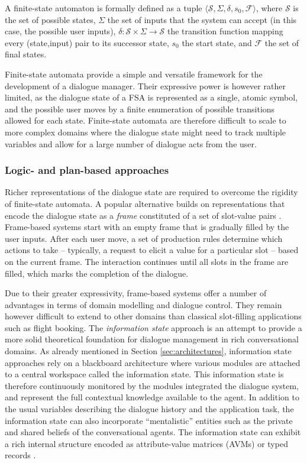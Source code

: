 A finite-state automaton is formally defined as a tuple $\langle \mathcal{S}, \Sigma, \delta, s_0, \mathcal{F} \rangle$, where $\mathcal{S}$ is the set of possible states, $\Sigma$ the set of inputs that the system can accept (in this case, the possible user inputs),  $\delta: \mathcal{S} \times \Sigma \rightarrow \mathcal{S}$ the transition function mapping every (state,input) pair to its successor state, $s_0$ the start state, and $\mathcal{F}$ the set of final states. 

Finite-state automata provide a simple and versatile framework for the development of a dialogue manager. Their expressive power is however rather limited, as the dialogue state of a FSA is represented as a single, atomic symbol, and the possible user moves by a finite enumeration of possible transitions allowed for each state.  Finite-state automata are therefore difficult to scale to more complex domains where the dialogue state might need to track multiple variables and allow for a large number of dialogue acts from the user.  

\subsubsection*{Logic- and plan-based approaches}

Richer representations of the dialogue state are required to overcome the rigidity of finite-state automata. A popular alternative builds on representations that encode the dialogue state as a \textit{frame} constituted of a set of slot-value pairs \citep{seneff2000}.  Frame-based systems start with an empty frame that is gradually filled by the user inputs.  After each user move, a set of production rules determine which actions to take  -- typically, a request to elicit a value for a particular slot -- based on the current frame.  The interaction continues until all slots in the frame are filled, which marks the completion of the dialogue. 

Due to their greater expressivity, frame-based systems offer a number of advantages in terms of domain modelling and dialogue control.  They remain however difficult to extend to other domains than classical slot-filling applications such as flight booking.  The \textit{information state} approach \citep{Larsson:2000} is an attempt to provide a more solid theoretical foundation for dialogue management in rich conversational domains.  As already mentioned in Section \ref{sec:architectures}, information state approaches rely on a blackboard architecture where various modules are attached to a central workspace called the information state. This information state is therefore continuously monitored by the modules integrated the dialogue system, and represent the full contextual knowledge available to the agent. In addition to the usual variables describing the dialogue history and the application task, the information state can also incorporate ``mentalistic'' entities such as the private and shared beliefs of the conversational agents.  The information state can exhibit a rich internal structure encoded as attribute-value matrices (AVMs) or typed records  \citep{RobinCooper2012}. 

